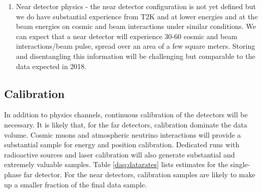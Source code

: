 \begin{enumerate}
\item Near detector physics - the near detector configuration is not yet defined  but we do have substantial experience from T2K and   at lower energies and   at the   beam energies on cosmic and beam interactions under similar conditions.  We can expect that a near detector will experience 30-60 cosmic and beam interactions/beam pulse, spread over an area of a few square meters.  Storing and disentangling this information will be challenging but comparable to the  data expected in 2018.



\end{enumerate}

\subsection{Calibration}
In addition to physics channels, continuous calibration of the detectors will be necessary.  It is likely that, for the far detectors, calibration dominate the data volume. Cosmic muons and atmospheric neutrino interactions will provide a substantial sample for energy and position calibration.  Dedicated runs with radioactive sources and laser calibration will also generate substantial and extremely valuable samples. Table \ref{daq:datarates} lists estimates for the single-phase far detector.  For the near detectors, calibration samples are likely to make up a smaller fraction of the final data sample.

